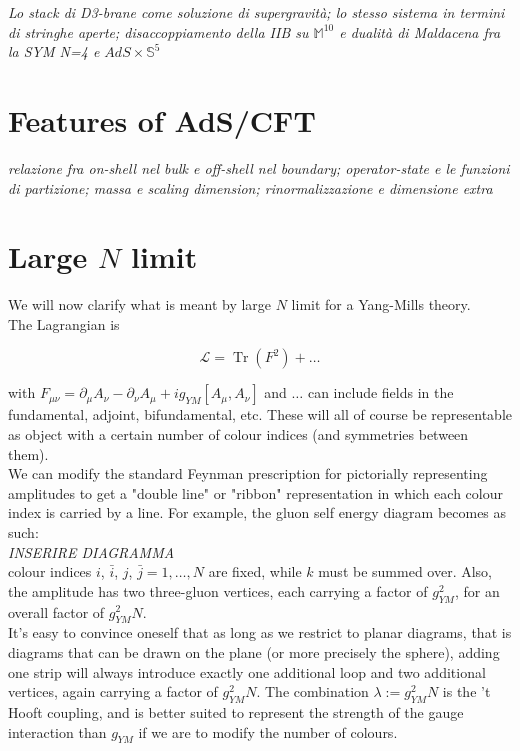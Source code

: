 \documentclass[11pt,a4paper,oneside,openright,titlepage]{book}
\DeclareMathOperator{\Tr}{Tr}
\newcommand{\cmmnt}[1]{\textcolor{Mahogany}{\emph{#1}}}
\begin{document}
\cmmnt{Lo stack di D3-brane come soluzione di supergravità; lo stesso sistema in termini di stringhe aperte; disaccoppiamento della IIB su $\mathbb{M}^{10}$ e dualità di Maldacena fra la SYM N=4 e $AdS \times \mathbb{S}^5$}

\section{Features of AdS/CFT}

\cmmnt{relazione fra on-shell nel bulk e off-shell nel boundary; operator-state e le funzioni di partizione; massa e scaling dimension; rinormalizzazione e dimensione extra}

\section{Large $N$ limit}

We will now clarify what is meant by large $N$ limit for a Yang-Mills theory.\\

The Lagrangian is

\[\mathcal{L} = \Tr \left(F^2\right) + \ldots \]

with $F_{\mu\nu} = \partial_\mu A_\nu - \partial_\nu A_\mu + i g_{YM} [A_\mu,A_\nu]$ and $\ldots$ can include fields in the fundamental, adjoint, bifundamental, etc. These will all of course be representable as object with a certain number of colour indices (and symmetries between them).\\

We can modify the standard Feynman prescription for pictorially representing amplitudes to get a "double line" or "ribbon" representation in which each colour index is carried by a line. For example, the gluon self energy diagram becomes as such:\\

\cmmnt{INSERIRE DIAGRAMMA}\\

colour indices $i$, $\bar i$, $j$, $\bar j = 1 , \ldots , N$ are fixed, while $k$ must be summed over. Also, the amplitude has two three-gluon vertices, each carrying a factor of $g_{YM}^2$, for an overall factor of $g_{YM}^2 N$.\\

It's easy to convince oneself that as long as we restrict to planar diagrams, that is diagrams that can be drawn on the plane (or more precisely the sphere), adding one strip will always introduce exactly one additional loop and two additional vertices, again carrying a factor of $g_{YM}^2 N$. The combination $\lambda := g_{YM}^2 N$ is the 't Hooft coupling, and is better suited to represent the strength of the gauge interaction than $g_{YM}$ if we are to modify the number of colours.\\
\end{document}
